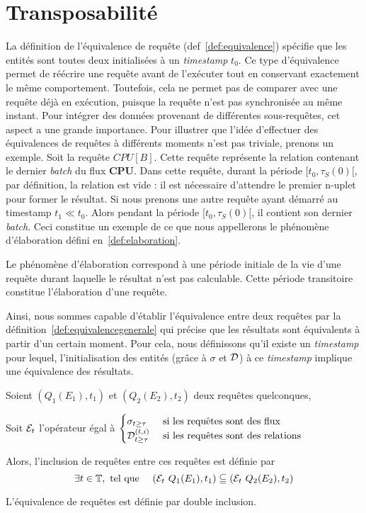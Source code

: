 \section{Transposabilité}\label{sec:contrib:astral:transposabilite}
La définition de l'équivalence de requête (def~\ref{def:equivalence}) spécifie que les entités sont toutes deux initialisées à un \textit{timestamp} $t_0$. Ce type d'équivalence permet de réécrire une requête avant de l'exécuter tout en conservant exactement le même comportement. Toutefois, cela ne permet pas de comparer avec une requête déjà en exécution, puisque la requête n'est pas synchronisée au même instant. Pour intégrer des données provenant de différentes sous-requêtes, cet aspect a une grande importance.
Pour illustrer que l'idée d'effectuer des équivalences de requêtes à différents moments n'est pas triviale, prenons un exemple. Soit la requête $CPU[B]$. Cette requête représente la relation contenant le dernier \textit{batch} du flux \textbf{CPU}. Dans cette requête, durant la période $[t_0,\tau_S(0)[$, par définition, la relation est vide : il est nécessaire d'attendre le premier n-uplet pour former le résultat. Si nous prenons une autre requête ayant démarré au timestamp $t_1 \ll t_0$. Alors pendant la période $[t_0,\tau_S(0)[$, il contient son dernier \textit{batch}. Ceci constitue un exemple de ce que nous appellerons le phénomène d'élaboration défini en~\ref{def:elaboration}.
\begin{defi}\label{def:elaboration}
    Le phénomène d'élaboration correspond à une période initiale de la vie d'une requête durant laquelle le résultat n'est pas calculable. Cette période transitoire constitue l'élaboration d'une requête.
\end{defi}

Ainsi, nous sommes capable d'établir l'équivalence entre deux requêtes par la définition~\ref{def:equivalencegenerale} qui précise que les résultats sont équivalents à partir d'un certain moment. Pour cela, nous définissons qu'il existe un \textit{timestamp} pour lequel, l'initialisation des entités (grâce à $\sigma$ et $\mathcal{D}$) à ce \textit{timestamp} implique une équivalence des résultats.
\begin{defi}\label{def:equivalencegenerale}
    Soient $(Q_1(E_1),t_1)$ et $(Q_2(E_2),t_2)$ deux requêtes quelconques,

    Soit $\mathcal{E}_t$ l'opérateur égal à $\begin{cases} \sigma_{t\geq \tau} & \textrm{ si les requêtes sont des flux}\\ \mathcal{D}_{t\geq \tau}^{(t,i)} & \textrm{  si les requêtes sont des relations}\end{cases}$

    Alors, l'inclusion de requêtes entre ces requêtes est définie par $$\exists t \in \mathbb{T}, \textrm{ tel que } \quad (\mathcal{E}_t\ Q_1(E_1), t_1) \subseteqq (\mathcal{E}_t\  Q_2(E_2), t_2)$$

    L'équivalence de requêtes est définie par double inclusion.
\end{defi}

